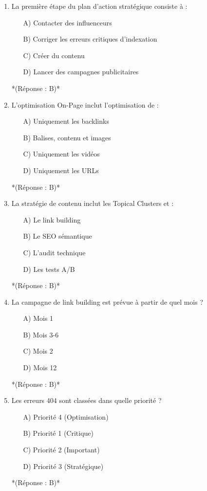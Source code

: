 \documentclass[12pt,a4paper,twoside]{report}
\begin{document}
\begin{enumerate}
    \item La première étape du plan d'action stratégique consiste à :
    \begin{itemize}
        \item[A)] Contacter des influenceurs
        \item[B)] Corriger les erreurs critiques d'indexation
        \item[C)] Créer du contenu
        \item[D)] Lancer des campagnes publicitaires
    \end{itemize}
    *(Réponse : B)*

    \item L'optimisation On-Page inclut l'optimisation de :
    \begin{itemize}
        \item[A)] Uniquement les backlinks
        \item[B)] Balises, contenu et images
        \item[C)] Uniquement les vidéos
        \item[D)] Uniquement les URLs
    \end{itemize}
    *(Réponse : B)*

    \item La stratégie de contenu inclut les Topical Clusters et :
    \begin{itemize}
        \item[A)] Le link building
        \item[B)] Le SEO sémantique
        \item[C)] L'audit technique
        \item[D)] Les tests A/B
    \end{itemize}
    *(Réponse : B)*

    \item La campagne de link building est prévue à partir de quel mois ?
    \begin{itemize}
        \item[A)] Mois 1
        \item[B)] Mois 3-6
        \item[C)] Mois 2
        \item[D)] Mois 12
    \end{itemize}
    *(Réponse : B)*

    \item Les erreurs 404 sont classées dans quelle priorité ?
    \begin{itemize}
        \item[A)] Priorité 4 (Optimisation)
        \item[B)] Priorité 1 (Critique)
        \item[C)] Priorité 2 (Important)
        \item[D)] Priorité 3 (Stratégique)
    \end{itemize}
    *(Réponse : B)*


\end{enumerate}
\end{document}
